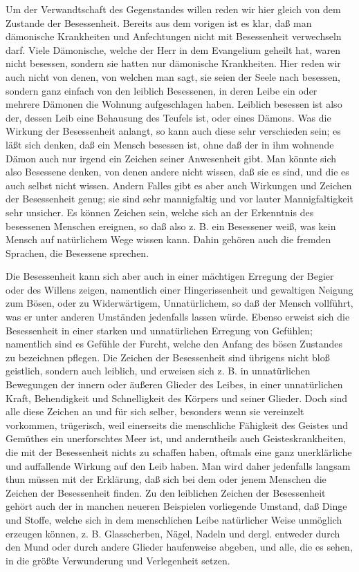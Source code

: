 Um der Verwandtschaft des Gegenstandes willen reden wir hier gleich von dem Zustande der Besessenheit. Bereits aus dem vorigen ist es klar, daß man dämonische Krankheiten und Anfechtungen nicht mit Besessenheit verwechseln darf. Viele Dämonische, welche der Herr in dem Evangelium geheilt hat, waren nicht besessen, sondern sie hatten nur dämonische Krankheiten. Hier reden wir auch nicht von denen, von welchen man sagt, sie seien der Seele nach besessen, sondern ganz einfach von den leiblich Besessenen, in deren Leibe ein oder mehrere
Dämonen die Wohnung aufgeschlagen haben. Leiblich besessen ist also der, dessen Leib eine Behausung des Teufels ist, oder eines Dämons. Was die Wirkung der Besessenheit anlangt, so kann auch diese sehr verschieden sein; es läßt sich denken, daß ein Mensch besessen ist, ohne daß der in ihm wohnende Dämon auch nur irgend ein Zeichen seiner Anwesenheit gibt. Man könnte sich also Besessene denken, von denen andere nicht wissen, daß sie es sind, und die es auch selbst nicht wissen. Andern Falles gibt es aber auch Wirkungen und Zeichen der Besessenheit genug; sie sind sehr mannigfaltig und vor lauter Mannigfaltigkeit sehr unsicher. Es können Zeichen sein, welche sich an der Erkenntnis des besessenen Menschen ereignen, so daß also z. B. ein Besessener weiß, was kein Mensch auf natürlichem Wege wissen kann. Dahin gehören auch die fremden Sprachen, die Besessene sprechen.

Die Besessenheit kann sich aber auch in einer mächtigen Erregung der Begier oder des Willens zeigen, namentlich einer Hingerissenheit und gewaltigen Neigung zum Bösen, oder zu Widerwärtigem, Unnatürlichem, so daß der Mensch vollführt, was er unter anderen Umständen jedenfalls lassen würde. Ebenso erweist sich die Besessenheit in einer starken und unnatürlichen Erregung von Gefühlen; namentlich sind es Gefühle der Furcht, welche den Anfang des bösen Zustandes zu bezeichnen pflegen. Die Zeichen der Besessenheit sind übrigens nicht bloß geistlich, sondern auch leiblich, und erweisen sich z. B. in unnatürlichen Bewegungen der innern oder äußeren Glieder des Leibes, in einer unnatürlichen Kraft, Behendigkeit und Schnelligkeit des Körpers und seiner Glieder. Doch sind
alle diese Zeichen an und für sich selber, besonders wenn sie vereinzelt vorkommen, trügerisch, weil einerseits die menschliche Fähigkeit des Geistes und Gemüthes ein unerforschtes Meer ist, und anderntheils auch Geisteskrankheiten, die mit der Besessenheit nichts zu schaffen haben, oftmals eine ganz unerklärliche und auffallende Wirkung auf den Leib haben. Man wird daher jedenfalls langsam thun müssen mit der Erklärung, daß sich bei dem oder jenem Menschen die Zeichen der Besessenheit finden. Zu den leiblichen Zeichen der Besessenheit gehört auch der in manchen neueren Beispielen vorliegende Umstand, daß Dinge und Stoffe, welche sich in dem menschlichen Leibe natürlicher Weise unmöglich erzeugen können, z. B. Glasscherben, Nägel, Nadeln und dergl. entweder durch den Mund oder durch andere Glieder haufenweise abgeben, und alle, die es sehen, in die größte Verwunderung und Verlegenheit setzen.

